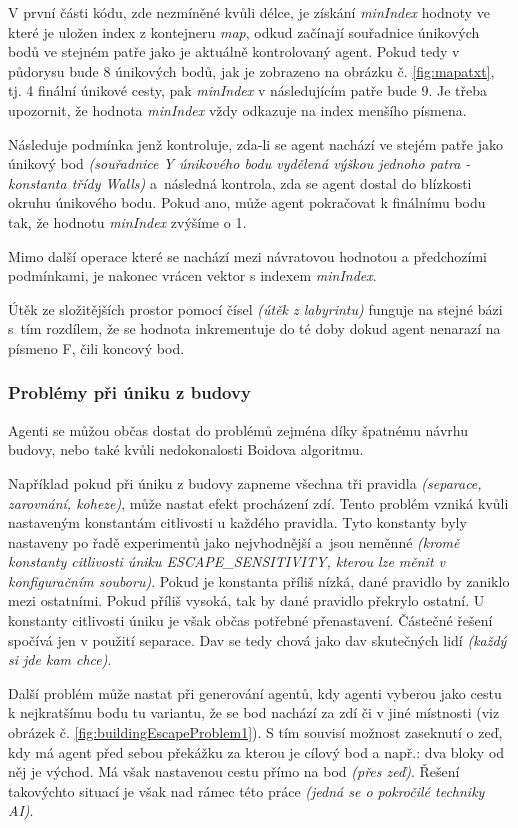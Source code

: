 \documentclass[czech,public,dept460,male,cpdeclaration]{diploma}
\begin{document}
V první části kódu, zde nezmíněné kvůli délce, je získání \textit{minIndex} hodnoty ve které je uložen index z kontejneru \textit{map}, odkud začínají souřadnice únikových bodů ve stejném patře jako je aktuálně kontrolovaný agent. Pokud tedy v půdorysu bude 8 únikových bodů, jak je zobrazeno na obrázku č. \ref{fig:mapatxt}, tj. 4 finální únikové cesty, pak \textit{minIndex} v následujícím patře bude 9. Je třeba upozornit, že hodnota \textit{minIndex} vždy odkazuje na index menšího písmena.

Následuje podmínka jenž kontroluje, zda-li se agent nachází ve stejém patře jako únikový bod \textit{(souřadnice Y únikového bodu vydělená výškou jednoho patra - konstanta třídy Walls)} a~následná kontrola, zda se agent dostal do blízkosti okruhu únikového bodu. Pokud ano, může agent pokračovat k finálnímu bodu tak, že hodnotu \textit{minIndex} zvýšíme o 1.

Mimo další operace které se nachází mezi návratovou hodnotou a předchozími podmínkami, je nakonec vrácen vektor s indexem \textit{minIndex}.

Útěk ze složitějších prostor pomocí čísel \textit{(útěk z labyrintu)} funguje na stejné bázi s~tím rozdílem, že se hodnota inkrementuje do té doby dokud agent nenarazí na písmeno F, čili koncový bod.

\subsubsection{Problémy při úniku z budovy}\label{sec:problemy-pri-uniku-z-budovy}

Agenti se můžou občas dostat do problémů zejména díky špatnému návrhu budovy, nebo také kvůli nedokonalosti Boidova algoritmu. 

Například pokud při úniku z budovy zapneme všechna tři pravidla \textit{(separace, zarovnání, koheze)}, může nastat efekt procházení zdí. Tento problém vzniká kvůli nastaveným konstantám citlivosti u každého pravidla. Tyto konstanty byly nastaveny po řadě experimentů jako nejvhodnější a~jsou neměnné \textit{(kromě konstanty citlivosti úniku ESCAPE\_SENSITIVITY, kterou lze měnit v konfiguračním souboru)}. Pokud je konstanta příliš nízká, dané pravidlo by zaniklo mezi ostatními. Pokud příliš vysoká, tak by dané pravidlo překrylo ostatní. U konstanty citlivosti úniku je však občas potřebné přenastavení. Částečné řešení spočívá jen v použití separace. Dav se tedy chová jako dav skutečných lidí \textit{(každý si jde kam chce)}.

Další problém může nastat při generování agentů, kdy agenti vyberou jako cestu \\k nejkratšímu bodu tu variantu, že se bod nachází za zdí či v jiné místnosti (viz obrázek č. \ref{fig:buildingEscapeProblem1}). S tím souvisí možnost zaseknutí o zeď, kdy má agent před sebou překážku za kterou je cílový bod a např.: dva bloky od něj je východ. Má však nastavenou cestu přímo na bod \textit{(přes zeď)}. Řešení takovýchto situací je však nad rámec této práce \textit{(jedná se o pokročilé techniky AI)}.
\end{document}
